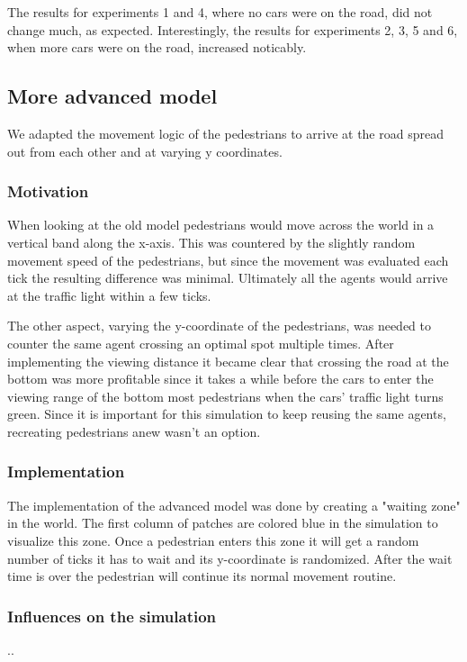 \documentclass[a4paper]{article}
\begin{document}
The results for experiments 1 and 4, where no cars were on the road, did not change much, as expected. Interestingly, the results for experiments 2, 3, 5 and 6, when more cars were on the road, increased noticably. 

\subsection{More advanced model}
We adapted the movement logic of the pedestrians to arrive at the road spread out from each other and at varying y coordinates.

\subsubsection{Motivation}
When looking at the old model pedestrians would move across the world in a vertical band along the x-axis. This was countered by the slightly random movement speed of the pedestrians, but since the movement was evaluated each tick the resulting difference was minimal. Ultimately all the agents would arrive at the traffic light within a few ticks.

The other aspect, varying the y-coordinate of the pedestrians, was needed to counter the same agent crossing an optimal spot multiple times. After implementing the viewing distance it became clear that crossing the road at the bottom was more profitable since it takes a while before the cars to enter the viewing range of the bottom most pedestrians when the cars' traffic light turns green.
Since it is important for this simulation to keep reusing the same agents, recreating pedestrians anew wasn't an option.

\subsubsection{Implementation}
The implementation of the advanced model was done by creating a "waiting zone" in the world. The first column of patches are colored blue in the simulation to visualize this zone. Once a pedestrian enters this zone it will get a random number of ticks it has to wait and its y-coordinate is randomized.
After the wait time is over the pedestrian will continue its normal movement routine.

\subsubsection{Influences on the simulation}
..
\end{document}
